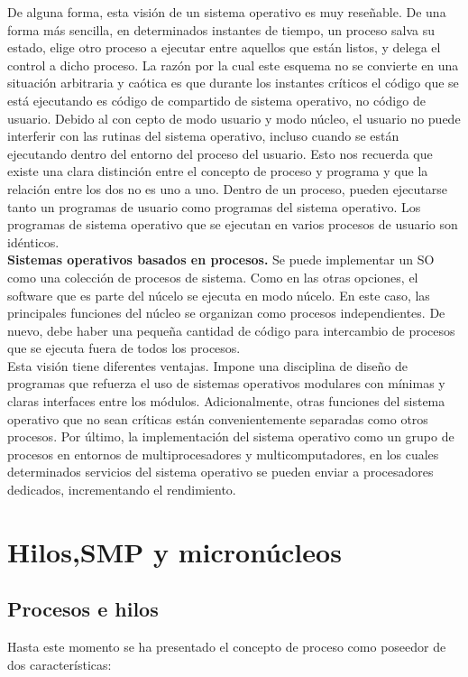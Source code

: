 \documentclass{article}
\begin{document}
					De alguna forma, esta visión de un sistema operativo es muy reseñable. De una forma más sencilla, en determinados instantes de tiempo, un proceso salva su estado, elige otro proceso a ejecutar entre aquellos que están listos, y delega el control a dicho proceso. La razón por la cual este esquema no se convierte en una situación arbitraria y caótica es que durante los instantes críticos el código que se está ejecutando es código de compartido de sistema operativo, no código de usuario. Debido al con cepto de modo usuario y modo núcleo, el usuario no puede interferir con las rutinas del sistema operativo, incluso cuando se están ejecutando dentro del entorno del proceso del usuario. Esto nos recuerda que existe una clara distinción entre el concepto de proceso y programa y que la relación entre los dos no es uno a uno. Dentro de un proceso, pueden ejecutarse tanto un programas de usuario como programas del sistema operativo. Los programas de sistema operativo que se ejecutan en varios procesos de usuario son idénticos. \\	
					
					\textbf{Sistemas operativos basados en procesos.} Se puede implementar un SO como una colección de procesos de sistema. Como en las otras opciones, el software que es parte del núcelo se ejecuta en modo núcelo. En este caso, las principales funciones del núcleo se organizan como procesos independientes. De nuevo, debe haber una pequeña cantidad de código para intercambio de procesos que se ejecuta fuera de todos los procesos. \\
					
					Esta visión tiene diferentes ventajas. Impone una disciplina de diseño de programas que refuerza el uso de sistemas operativos modulares con mínimas y claras interfaces entre los módulos. Adicionalmente, otras funciones del sistema operativo que no sean críticas están convenientemente separadas como otros procesos. Por último, la implementación del sistema operativo como un grupo de procesos en entornos de multiprocesadores y multicomputadores, en los cuales determinados servicios del sistema operativo se pueden enviar a procesadores dedicados, incrementando el rendimiento.
					
		\section{Hilos,SMP y micronúcleos}
			\subsection{Procesos e hilos}
				Hasta este momento se ha presentado el concepto de proceso como poseedor de dos características:
				
\end{document}
